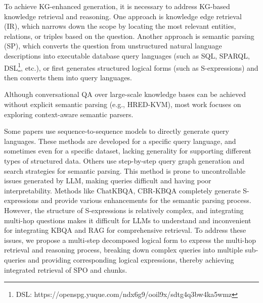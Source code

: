\documentclass{article}
\begin{document}
To achieve KG-enhanced generation, it is necessary to address KG-based knowledge retrieval and reasoning. One approach is knowledge edge retrieval (IR)\cite{yao2007knowledge}, which narrows down the scope by locating the most relevant entities, relations, or triples based on the question. Another approach is semantic parsing (SP)\cite{berant2013semantic,guo2018dialog}, which converts the question from unstructured natural language descriptions into executable database query languages (such as SQL, SPARQL\cite{perez2006semantics}, DSL\footnote{DSL: https://openspg.yuque.com/ndx6g9/ooil9x/sdtg4q3bw4ka5wmz}, etc.), or first generates structured logical forms (such as S-expressions\cite{gu2021beyond,luo2024chatkbqa}) and then converts them into query languages.

Although conversational QA over large-scale knowledge bases can be achieved without explicit semantic parsing (e.g., HRED-KVM\cite{kacupaj2021conversational}), most work focuses on exploring context-aware semantic parsers\cite{guo2018dialog,lan2021modeling,luo2024chatkbqa}.

Some papers use sequence-to-sequence models to directly generate query languages\cite{kapanipathi2021leveraging,omar2023universal}. These methods are developed for a specific query language, and sometimes even for a specific dataset, lacking generality for supporting different types of structured data. Others use step-by-step query graph generation and search strategies for semantic parsing\cite{atif2023beamqa,jiang2023structgpt,gu2023dont}. This method is prone to uncontrollable issues generated by LLM, making queries difficult and having poor interpretability. Methods like ChatKBQA\cite{luo2024chatkbqa}, CBR-KBQA\cite{das2021case} completely generate S-expressions and provide various enhancements for the semantic parsing process. However, the structure of S-expressions is relatively complex, and integrating multi-hop questions makes it difficult for LLMs to understand and inconvenient for integrating KBQA and RAG for comprehensive retrieval. To address these issues, we propose a multi-step decomposed logical form to express the multi-hop retrieval and reasoning process, breaking down complex queries into multiple sub-queries and providing corresponding logical expressions, thereby achieving integrated retrieval of SPO and chunks.
\end{document}
